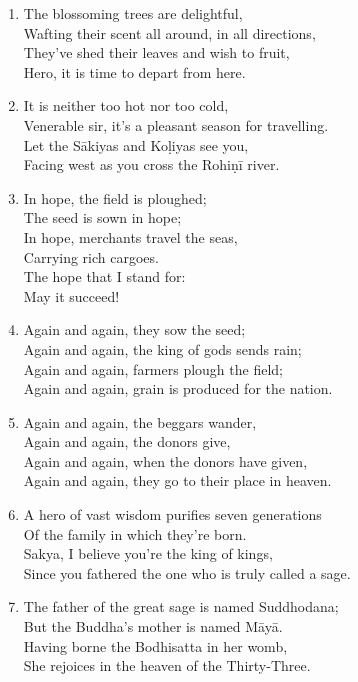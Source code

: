\documentclass[10pt, openany]{book}
\begin{document}
\begin{enumerate}
\item The blossoming trees are delightful,\\
Wafting their scent all around, in all directions,\\
They’ve shed their leaves and wish to fruit,\\
Hero, it is time to depart from here.

\item It is neither too hot nor too cold,\\
Venerable sir, it’s a pleasant season for travelling.\\
Let the Sākiyas and Koḷiyas see you,\\
Facing west as you cross the Rohiṇī river.

\item In hope, the field is ploughed;\\
The seed is sown in hope;\\
In hope, merchants travel the seas,\\
Carrying rich cargoes.\\
The hope that I stand for:\\
May it succeed!

\item Again and again, they sow the seed;\\
Again and again, the king of gods sends rain;\\
Again and again, farmers plough the field;\\
Again and again, grain is produced for the nation.

\item Again and again, the beggars wander,\\
Again and again, the donors give,\\
Again and again, when the donors have given,\\
Again and again, they go to their place in heaven.

\item A hero of vast wisdom purifies seven generations\\
Of the family in which they’re born.\\
Sakya, I believe you’re the king of kings,\\
Since you fathered the one who is truly called a sage.

\item The father of the great sage is named Suddhodana;\\
But the Buddha’s mother is named Māyā.\\
Having borne the Bodhisatta in her womb,\\
She rejoices in the heaven of the Thirty-Three.


\end{enumerate}
\end{document}
